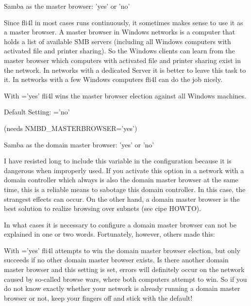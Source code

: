 \begin{description}

  Samba as the master browser: 'yes' or 'no'

  Since fli4l in most cases runs continuously, it sometimes
  makes sense to use it as a master browser. A master browser
  in Windows networks is a computer that holds a list of available SMB
  servers (including all Windows computers with activated file and
  printer sharing). So the Windows clients can learn from
  the master browser which computers with activated file and
  printer sharing  exist in the network. In networks with a dedicated
  Server it is better to leave this task to it. In networks with
  a few Windows computers fli4l can do the job nicely.

  With ='yes' fli4l wins the master browser
  election against all Windows machines.

  Default Setting: ='no'


 (needs NMBD\_MASTERBROWSER='yes')

  Samba as the domain master browser: 'yes' or 'no'

  I have resisted long to include this variable in the configuration
  because it is dangerous when improperly used.
  If you activate this option in a network with a domain controller
  which always is also the domain master browser at the same time,
  this is a reliable means to sabotage this domain controller.
  In this case, the strangest effects can occur.
  On the other hand, a domain master browser is the best solution
  to realize browsing over subnets (see cipe HOWTO).

  In what cases it is necessary to configure a domain master browser can
  not be explained in one or two words. Fortunately, however, others made this:



  With ='yes' fli4l attempts to win
  the domain master browser election, but only succeeds if no other
  domain master browser exists. Is there another domain master browser
  and this setting is set, errors will definitely occur on the network
  caused by so-called browse wars, where both computers attempt to win.
  So if you do not know exactly whether your network is already running
  a domain master browser or not, keep your fingers off and stick with
  the default!


\end{description}
